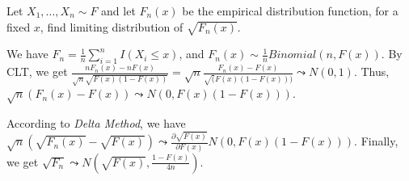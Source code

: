 \begin{problem}
    Let $X_1,\ldots,X_n\sim F$ and let $ F_n(x)$ be the empirical distribution function, for a fixed $x$,  find limiting distribution of $\sqrt{F_n(x)}$.
\end{problem}

\begin{solution}
We have $F_n=\frac{1}{n} \sum_{i=1}^n I(X_i \le x)$, and $F_n (x) \sim \frac{1}{n} Binomial(n, F(x))$.
By CLT, we get $\frac{n F_n(x)- nF(x)}{\sqrt{n}\sqrt{F(x)(1-F(x))}} = \sqrt{n} \frac{F_n(x)- F(x)}{\sqrt(F(x)(1-F(x)))} \leadsto N(0,1)$.
Thus, $\sqrt{n} ( F_n(x)- F(x) ) \leadsto N(0, F(x)(1-F(x)))$. 

According to \emph{Delta Method}, we have $\sqrt{n} (\sqrt{F_n (x)} -\sqrt{F (x)}) \leadsto \frac{\partial \sqrt{F(x)}}{\partial F(x)} N(0, F(x)(1-F(x)))$. 
Finally, we get $\sqrt{F_n} \leadsto N(\sqrt{F(x)}, \frac{1-F(x)}{4n})$.




\end{solution}






